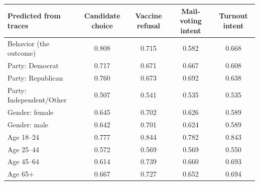 \begin{tabular}{lcccc}
\toprule
Predicted from traces & Candidate choice & Vaccine refusal & Mail-voting intent & Turnout intent \\
\midrule
Behavior (the outcome) & 0.808 & 0.715 & 0.582 & 0.668 \\
\midrule
Party: Democrat & 0.717 & 0.671 & 0.667 & 0.608 \\
Party: Republican & 0.760 & 0.673 & 0.692 & 0.638 \\
Party: Independent/Other & 0.507 & 0.541 & 0.535 & 0.535 \\
Gender: female & 0.645 & 0.702 & 0.626 & 0.589 \\
Gender: male & 0.642 & 0.701 & 0.624 & 0.589 \\
Age 18--24 & 0.777 & 0.844 & 0.782 & 0.843 \\
Age 25--44 & 0.572 & 0.569 & 0.569 & 0.550 \\
Age 45--64 & 0.614 & 0.739 & 0.660 & 0.693 \\
Age 65+ & 0.667 & 0.727 & 0.652 & 0.694 \\
\bottomrule
\end{tabular}